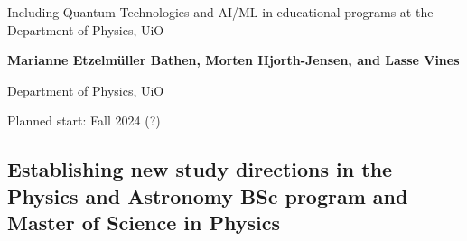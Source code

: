 \documentclass[%
oneside,                 %
final,                   %
10pt]{article}
\begin{document}

\newcommand{\exercisesection}[1]{\subsection*{#1}}






\thispagestyle{empty}

\begin{center}
{\LARGE\bf
\begin{spacing}{1.25}
Including Quantum Technologies and AI/ML in educational programs at the Department of Physics, UiO
\end{spacing}
}
\end{center}


\begin{center}
{\bf Marianne Etzelm\"uller Bathen, Morten Hjorth-Jensen, and Lasse Vines}
\end{center}

    \begin{center}
\centerline{{\small Department of Physics, UiO}}
\end{center}
    


\begin{center}
Planned start: Fall 2024 (?)
\end{center}

\vspace{1cm}


\subsection{Establishing new study directions in the Physics and Astronomy BSc program and Master of Science in Physics}


\end{document}

